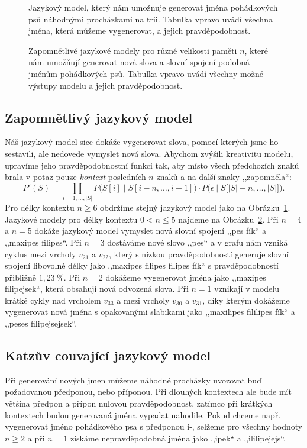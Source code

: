 \documentclass{csbulletin}
\begin{document}
\begin{figure}
\centering
\relax
\caption{Jazykový model, který nám umožnuje generovat jména pohádkových psů náhodnými procházkami na trii. Tabulka vpravo uvádí všechna jména, která můžeme vygenerovat, a jejich pravděpodobnost.}
\label{fig:language-model-6}
\end{figure}

\begin{figure}[p]
\centering

\caption{Zapomnětlivé jazykové modely pro různé velikosti paměti $n$, které nám umožňují generovat nová slova a slovní spojení podobná jménům pohádkových psů. Tabulka vpravo uvádí všechny možné výstupy modelu a jejich pravděpodobnost.}
\label{fig:language-model-5-1}
\end{figure}

\subsection{Zapomnětlivý jazykový model}
Náš jazykový model sice dokáže vygenerovat slova, pomocí kterých jsme ho sestavili, ale nedovede vymyslet nová slova. Abychom zvýšili kreativitu modelu, upravíme jeho pravděpodobnostní funkci tak, aby místo všech předchozích znaků brala v potaz pouze \emph{kontext} posledních $n$ znaků a na další znaky ,,zapomněla``:
\begin{equation}
P'(S) = \prod_{i = 1,\ldots,|S|} P\big(S[i]\mid S[i-n, \ldots, i-1]\big)\cdot P\big(\epsilon\mid S\big[|S|-n, \ldots, |S|\big]\big).
\end{equation}
Pro délky kontextu $n\geq 6$ obdržíme stejný jazykový model jako na Obrázku~\ref{fig:language-model-6}. Jazykové modely pro délky kontextu $0<n\leq 5$ najdeme na Obrázku~\ref{fig:language-model-5-1}. Při $n=4$ a $n=5$ dokáže jazykový model vymyslet nová slovní spojení ,,pes fík`` a ,,maxipes filipes``. Při $n=3$ dostáváme nové slovo ,,pes`` a v grafu nám vzniká cyklus mezi vrcholy $v_{21}$ a $v_{22}$, který s nízkou pravděpodobností generuje slovní spojení libovolné délky jako ,,maxipes filipes filipes fík`` s pravděpodobností přibližně $1{,}23\ \%$. Při $n=2$ dokážeme vygenerovat jména jako ,,maxipes filipejsek``, která obsahují nová odvozená slova. Při $n=1$ vznikají v modelu krátké cykly nad vrcholem $v_{33}$ a mezi vrcholy $v_{30}$ a $v_{31}$, díky kterým dokážeme vygenerovat nová jména s opakovanými slabikami jako ,,maxilipes fililipes fík`` a ,,peses filipejsejsek``.

\subsection{Katzův couvající jazykový model}
Při generování nových jmen můžeme náhodné procházky uvozovat buď požadovanou předponou, nebo příponou. Při dlouhých kontextech ale bude mít většina předpon a přípon nulovou pravděpodobnost, zatímco při krátkých kontextech budou generovaná jména vypadat nahodile. Pokud chceme např. vygenerovat jméno pohádkového psa s předponou i-, selžeme pro všechny hodnoty $n\geq 2$ a při $n=1$ získáme nepravděpodobná jména jako ,,ipek`` a ,,ililipejejs``.
\end{document}
